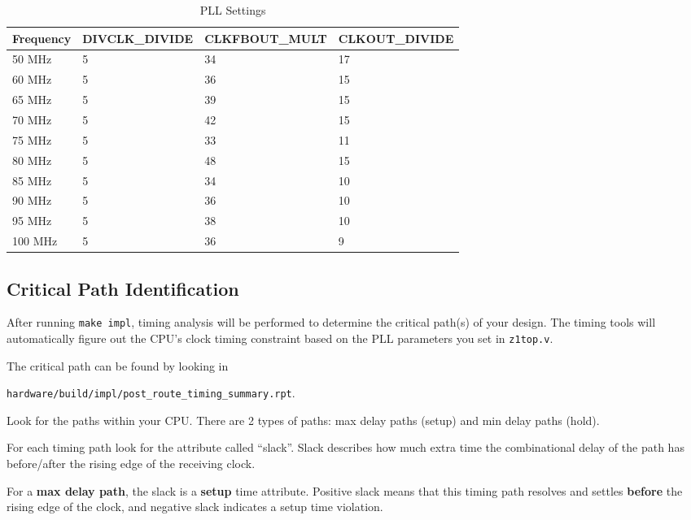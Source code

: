 \begin{table}[hbt]
  \begin{center}
    \caption{PLL Settings}
    \label{mem_map1}
    \begin{adjustbox}{width=\columnwidth,center}
    \begin{tabular}{l l l l}
      \toprule
      \textbf{Frequency} & \textbf{DIVCLK\_DIVIDE} & \textbf{CLKFBOUT\_MULT} & \textbf{CLKOUT\_DIVIDE}\\
      \midrule
      50 MHz & 5 & 34 & 17 \\
      60 MHz & 5 & 36 & 15 \\
      65 MHz & 5 & 39 & 15 \\
      70 MHz & 5 & 42 & 15 \\
      75 MHz & 5 & 33 & 11 \\
      80 MHz & 5 & 48 & 15 \\
      85 MHz & 5 & 34 & 10 \\
      90 MHz & 5 & 36 & 10 \\
      95 MHz & 5 & 38 & 10 \\
      100 MHz & 5	& 36 & 9 \\   
      \bottomrule
    \end{tabular}
    \end{adjustbox}
  \end{center}
\end{table}

\subsection{Critical Path Identification}
After running \verb|make impl|, timing analysis will be performed to determine the critical path(s) of your design.
The timing tools will automatically figure out the CPU's clock timing constraint based on the PLL parameters you set in \verb|z1top.v|.

The critical path can be found by looking in

\verb|hardware/build/impl/post_route_timing_summary.rpt|.

Look for the paths within your CPU. There are 2 types of paths: max delay paths (setup) and min delay paths (hold).

For each timing path look for the attribute called ``slack''.
Slack describes how much extra time the combinational delay of the path has before/after the rising edge of the receiving clock.

For a \textbf{max delay path}, the slack is a \textbf{setup} time attribute.
Positive slack means that this timing path resolves and settles \textbf{before} the rising edge of the clock, and negative slack indicates a setup time violation.

